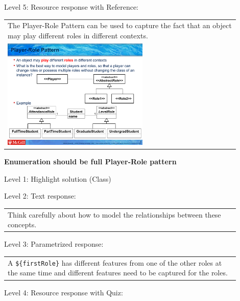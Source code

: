 \noindent Level 5: Resource response with Reference: \medskip

\begin{tabular}{|p{0.9\linewidth}}
The Player-Role Pattern can be used to capture the fact that an object may play different roles
in different contexts.

\\
\includegraphics[width=0.6\textwidth]{images/player_role.png}
\end{tabular} \medskip


\noindent \textbf{Enumeration should be full Player-Role pattern} \medskip

\noindent Level 1: Highlight solution (Class) \medskip

\noindent Level 2: Text response: \medskip

\begin{tabular}{|p{0.9\linewidth}}
Think carefully about how to model the relationships between these concepts.
\end{tabular} \medskip

\noindent Level 3: Parametrized response: \medskip

\begin{tabular}{|p{0.9\linewidth}}
A \verb|${firstRole}| has different features from one of the other roles at the same time and different features need to be captured for the roles.
\end{tabular} \medskip

\noindent Level 4: Resource response with Quiz: \medskip


